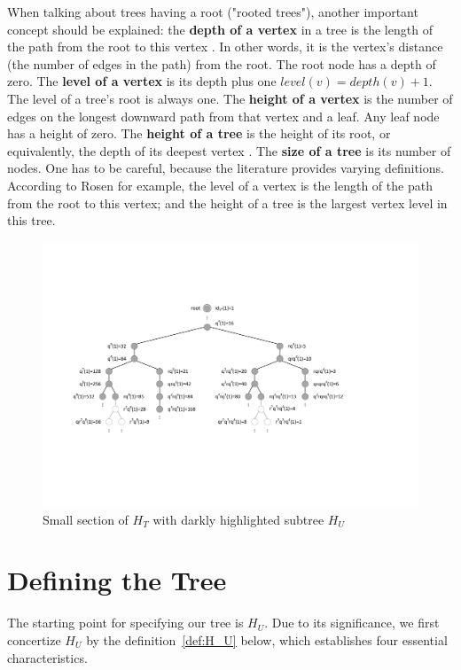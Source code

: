 \begin{remark}
When talking about trees having a root ("rooted trees"), another important concept should be explained: the \textbf{depth of a vertex} in a tree is the length of the path from the root to this vertex \cite[p.~226]{Ref_Sedgewick_2011}. In other words, it is the vertex's distance (the number of edges in the path) from the root. The root node has a depth of zero. The \textbf{level of a vertex} is its depth plus one $level(v)=depth(v)+1$. The level of a tree's root is always one. The \textbf{height of a vertex} is the number of edges on the longest downward path from that vertex and a leaf. Any leaf node has a height of zero. The \textbf{height of a tree} is the height of its root, or equivalently, the depth of its deepest vertex \cite[p.~226]{Ref_Sedgewick_2011}. The \textbf{size of a tree} is its number of nodes. One has to be careful, because the literature provides varying definitions. According to Rosen \cite[p.~804]{Ref_Rosen} for example, the level of a vertex is the length of the path from the root to this vertex; and the height of a tree is the largest vertex level in this tree.
\end{remark}

\begin{figure}
	\includegraphics[trim=2.3cm 5.8cm 5.9cm 4.8cm, 
	width=1.00\textwidth,page=1]{figures/caytree.pdf}
	\caption{Small section of $H_T$ with darkly highlighted subtree $H_U$}
	\label{fig:1}
\end{figure}

\section{Defining the Tree}
The starting point for specifying our tree is $H_U$. Due to its significance, we first concertize $H_U$ by the definition~\ref{def:H_U} below, which establishes four essential characteristics.

